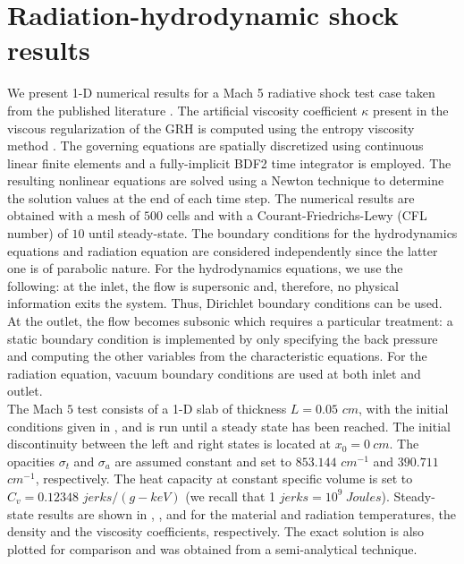 \documentclass{mc2015}
\begin{document}
\section{Radiation-hydrodynamic shock results}\label{sec:rez}
%
We present 1-D numerical results for a Mach 5 radiative shock test case taken from the published literature \cite{EdwardsMorelLowrie}. The artificial viscosity coefficient $\kappa$ present in the viscous regularization of the GRH is computed using the entropy viscosity method \cite{jlg1,jlg2,our_jcp_radhy_paper}. The governing equations are spatially discretized using continuous linear finite elements and a fully-implicit BDF2 time integrator is employed. The resulting nonlinear equations are solved using a Newton technique to determine the solution values at the end of each time step. The numerical results are obtained with a mesh of $500$ cells and with a Courant-Friedrichs-Lewy (CFL number) of $10$ until steady-state. The boundary conditions for the hydrodynamics equations and radiation equation are considered independently since the latter one is of parabolic nature. For the hydrodynamics equations, we use the following: at the inlet, the flow is supersonic and, therefore, no physical information exits the system. Thus, Dirichlet boundary conditions can be used. At the outlet, the flow becomes subsonic which requires a particular treatment: a static boundary condition is implemented by only specifying the back pressure and computing the other variables from the characteristic equations. For the radiation equation, vacuum boundary conditions are used at both inlet and outlet. \\
%
The Mach $5$ test consists of a 1-D slab of thickness $L=0.05$ $cm$, with the initial conditions given in , and is run until a steady state has been reached. The initial discontinuity between the left and right states is located at $x_0 = 0  \ cm$. The opacities $\sigma_t$ and $\sigma_a$ are assumed constant and set to $853.144$ $cm^{-1}$ and $390.711$ $cm^{-1}$, respectively. The heat capacity at constant specific volume is set to $C_v = 0.12348$ $jerks/(g-keV)$ (we recall that 1 $jerks = 10^9\ Joules$). Steady-state results are shown in , , and  for the material and radiation temperatures, the density and the viscosity coefficients, respectively. The exact solution is also plotted for comparison and was obtained from a semi-analytical technique.
\end{document}
